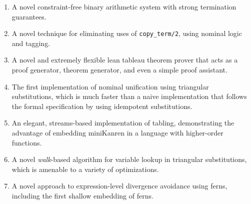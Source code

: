 \begin{enumerate}
\item A novel constraint-free binary arithmetic system with strong termination
guarantees.

\item A novel technique for eliminating uses of \mbox{{\tt copy\_term/2}}, using
nominal logic and tagging.


\item A novel and extremely flexible lean tableau theorem prover that
acts as a proof generator, theorem generator, and even a simple
proof assistant.



\item The first implementation of nominal unification using triangular
substitutions, which is much faster than a naive implementation that
follows the formal specification by using idempotent substitutions.

\item An elegant, streams-based implementation of tabling,
demonstrating the advantage of embedding miniKanren in a language with
higher-order functions.

\item A novel \emph{walk}-based algorithm for variable lookup in
triangular substitutions, which is amenable to a variety of
optimizations.




\item A novel approach to expression-level divergence avoidance using
ferns, including the first shallow embedding of ferns.
\end{enumerate}

